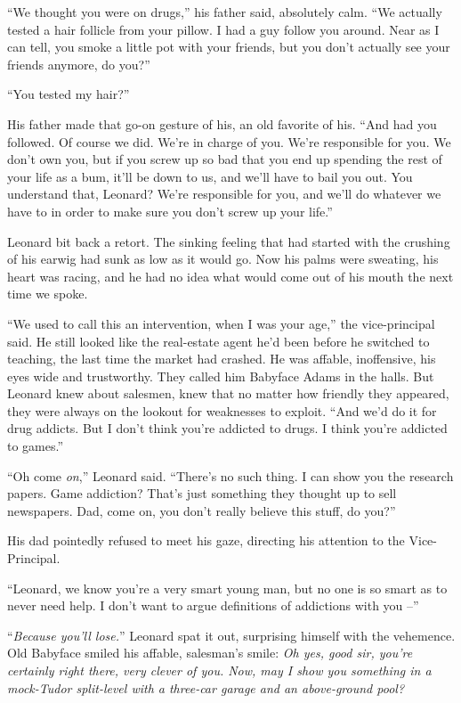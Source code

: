 ``We thought you were on drugs,'' his father said, absolutely calm.
``We actually tested a hair follicle from your pillow. I had a guy
follow you around. Near as I can tell, you smoke a little pot with
your friends, but you don't actually see your friends anymore, do
you?''

``You tested my hair?''

His father made that go-on gesture of his, an old favorite of his.
``And had you followed. Of course we did. We're in charge of you.
We're responsible for you. We don't own you, but if you screw up so
bad that you end up spending the rest of your life as a bum, it'll
be down to us, and we'll have to bail you out. You understand that,
Leonard? We're responsible for you, and we'll do whatever we have
to in order to make sure you don't screw up your life.''

Leonard bit back a retort. The sinking feeling that had started
with the crushing of his earwig had sunk as low as it would go. Now
his palms were sweating, his heart was racing, and he had no idea
what would come out of his mouth the next time we spoke.

``We used to call this an intervention, when I was your age,'' the
vice-principal said. He still looked like the real-estate agent
he'd been before he switched to teaching, the last time the market
had crashed. He was affable, inoffensive, his eyes wide and
trustworthy. They called him Babyface Adams in the halls. But
Leonard knew about salesmen, knew that no matter how friendly they
appeared, they were always on the lookout for weaknesses to
exploit. ``And we'd do it for drug addicts. But I don't think you're
addicted to drugs. I think you're addicted to games.''

``Oh come \emph{on},'' Leonard said. ``There's no such thing. I can
show you the research papers. Game addiction? That's just something
they thought up to sell newspapers. Dad, come on, you don't really
believe this stuff, do you?''

His dad pointedly refused to meet his gaze, directing his attention
to the Vice-Principal.

``Leonard, we know you're a very smart young man, but no one is so
smart as to never need help. I don't want to argue definitions of
addictions with you --''

``\emph{Because you'll lose.}'' Leonard spat it out, surprising
himself with the vehemence. Old Babyface smiled his affable,
salesman's smile:
\emph{Oh yes, good sir, you're certainly right there, very clever of you. Now, may I show you something in a mock-Tudor split-level with a three-car garage and an above-ground pool?}


